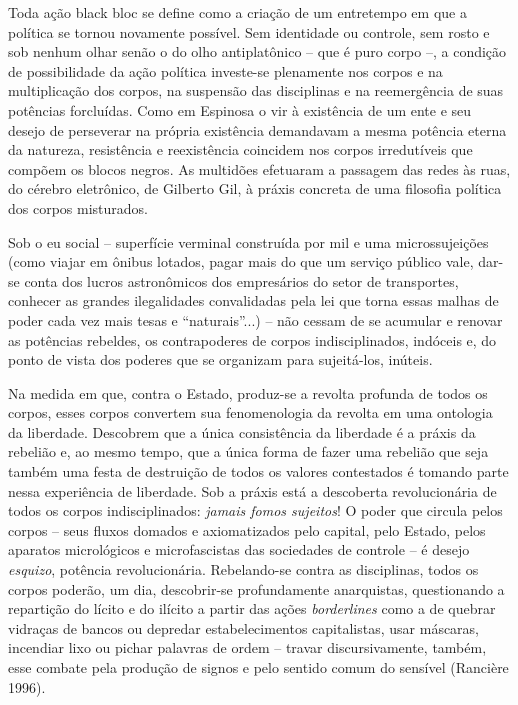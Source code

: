 \emph{}Toda ação black bloc se define como a criação de um entretempo em
que a política se tornou novamente possível. Sem identidade ou controle,
sem rosto e sob nenhum olhar senão o do olho antiplatônico -- que é puro
corpo --, a condição de possibilidade da ação política investe-se
plenamente nos corpos e na multiplicação dos corpos, na suspensão das
disciplinas e na reemergência de suas potências forcluídas. Como em
Espinosa o vir à existência de um ente e seu desejo de perseverar na
própria existência demandavam a mesma potência eterna da natureza,
resistência e reexistência coincidem nos corpos irredutíveis que compõem
os blocos negros. As multidões efetuaram a passagem das redes às ruas,
do cérebro eletrônico, de Gilberto Gil, à práxis concreta de uma
filosofia política dos corpos misturados.

Sob o eu social -- superfície verminal construída por mil e uma
microssujeições (como viajar em ônibus lotados, pagar mais do que um
serviço público vale, dar-se conta dos lucros astronômicos dos
empresários do setor de transportes, conhecer as grandes ilegalidades
convalidadas pela lei que torna essas malhas de poder cada vez mais
tesas e ``naturais''...) -- não cessam de se acumular e renovar as
potências rebeldes, os contrapoderes de corpos indisciplinados, indóceis
e, do ponto de vista dos poderes que se organizam para sujeitá-los,
inúteis.

Na medida em que, contra o Estado, produz-se a revolta profunda de todos
os corpos, esses corpos convertem sua fenomenologia da revolta em uma
ontologia da liberdade. Descobrem que a única consistência da liberdade
é a práxis da rebelião e, ao mesmo tempo, que a única forma de fazer uma
rebelião que seja também uma festa de destruição de todos os valores
contestados é tomando parte nessa experiência de liberdade. Sob a práxis
está a descoberta revolucionária de todos os corpos indisciplinados:
\emph{jamais fomos sujeitos}! O poder que circula pelos corpos -- seus
fluxos domados e axiomatizados pelo capital, pelo Estado, pelos aparatos
micrológicos e microfascistas das sociedades de controle -- é desejo
\emph{esquizo}, potência revolucionária. Rebelando-se contra as
disciplinas, todos os corpos poderão, um dia, descobrir-se profundamente
anarquistas, questionando a repartição do lícito e do ilícito a partir
das ações \emph{borderlines }como a de quebrar vidraças de bancos ou
depredar estabelecimentos capitalistas, usar máscaras, incendiar lixo ou
pichar palavras de ordem -- travar discursivamente, também, esse combate
pela produção de signos e pelo sentido comum do sensível (Rancière
1996).


